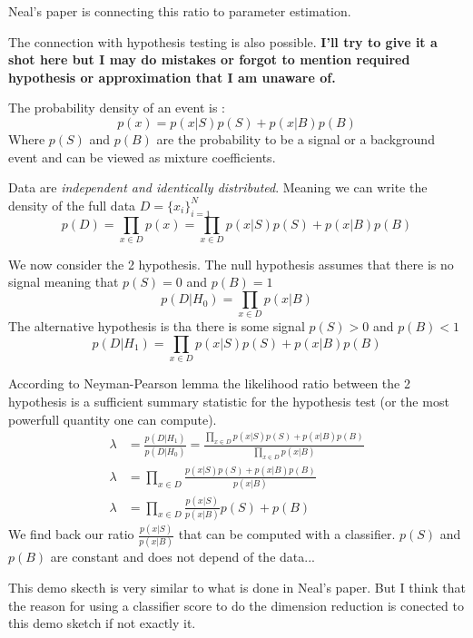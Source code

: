 Neal's paper \cite{Neal:2007zz} is connecting this ratio to parameter estimation.

The connection with hypothesis testing is also possible.
\textbf{I'll try to give it a shot here but I may do mistakes or forgot to mention required hypothesis or approximation that I am unaware of.}

The probability density of an event is :
\begin{equation}
 	p(x) = p(x|S) p(S) + p(x|B) p(B)
\end{equation} 
Where $p(S)$ and $p(B)$ are the probability to be a signal or a background event and can be viewed as mixture coefficients.

Data are \emph{independent and identically distributed}.
Meaning we can write the density of the full data $D = \{x_i\}_{i=1}^N$
\begin{equation}
	p(D) = \prod_{x\in D} p(x) = \prod_{x\in D} p(x|S) p(S) + p(x|B) p(B)
\end{equation}

We now consider the 2 hypothesis.
The null hypothesis assumes that there is no signal meaning that $p(S) = 0$ and $p(B) = 1$
\begin{equation}
	p(D |H_0) = \prod_{x\in D} p(x|B)
\end{equation}
The alternative hypothesis is tha there is some signal $p(S) > 0$ and $p(B) < 1$
\begin{equation}
	p(D | H_1) = \prod_{x\in D} p(x|S) p(S) + p(x|B) p(B)
\end{equation}

According to Neyman-Pearson lemma \cite{neyman_pearson_1933} the likelihood ratio between the 2 hypothesis is a sufficient summary statistic for the hypothesis test (or the most powerfull quantity one can compute).
\begin{align}
	\lambda & = \frac{p(D | H_1)}{p(D |H_0)} = \frac{\prod_{x\in D} p(x|S) p(S) + p(x|B) p(B)}{\prod_{x\in D} p(x|B)} \\
	\lambda & = \prod_{x\in D} \frac{ p(x|S) p(S) + p(x|B) p(B)}{p(x|B)} \\
	\lambda & = \prod_{x\in D}  \frac{p(x|S)}{p(x|B)}  p(S) + p(B)
\end{align}
We find back our ratio $\frac{p(x|S)}{p(x|B)}$ that can be computed with a classifier.
$p(S)$ and $p(B)$ are constant and does not depend of the data...

This demo skecth is very similar to what is done in Neal's paper.
But I think that the reason for using a classifier score to do the dimension reduction is conected to this demo sketch if not exactly it. 



